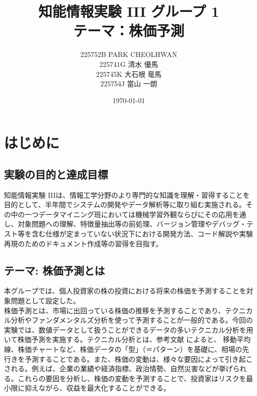 \documentclass[a4paper, 11pt, titlepage]{jsarticle}
\title{知能情報実験 I\hspace{-1.2pt}I\hspace{-1.2pt}I グループ 1 \\ テーマ：株価予測}
\author{225752B PARK CHEOLHWAN \\ 225741G 清水 優馬 \\ 225745K 大石根 竜馬 \\ 225754J 當山 一朗}
\date{\today}
\begin{document}
\maketitle
\tableofcontents
\clearpage

\section{はじめに}
\subsection{実験の目的と達成目標}
\indent 知能情報実験 I\hspace{-1.2pt}I\hspace{-1.2pt}Iは、情報工学分野のより専門的な知識を理解・習得することを目的として、半年間でシステムの開発やデータ解析等に取り組む実施される。その中の一つデータマイニング班においては機械学習外観ならびにその応用を通し、対象問題への理解、特徴量抽出等の前処理、バージョン管理やデバッグ・テスト等を含む仕様が定まっていない状況下における開発方法、コード解説や実験再現のためのドキュメント作成等の習得を目指す。
\subsection{テーマ: 株価予測とは}
\indent 本グループでは、個人投資家の株の投資における将来の株価を予測することを対象問題として設定した。\\
\indent 株価予測とは、市場に出回っている株価の推移を予測することであり、テクニカル分析やファンダメンタルズ分析を使って予測することが一般的である。今回の実験では、数値データとして扱うことができるデータの多いテクニカル分析を用いて株価予測を実施する。テクニカル分析とは、参考文献 \cite{tech}によると、 移動平均線、株価チャートなど、株価データの「型」（＝パターン）を基礎に、相場の先行きを予測することである。また、株価の変動は、様々な要因によって引き起こされる。例えば、企業の業績や経済指標、政治情勢、自然災害などが挙げられる。これらの要因を分析し、株価の変動を予測することで、投資家はリスクを最小限に抑えながら、収益を最大化することができる。\\
\end{document}
